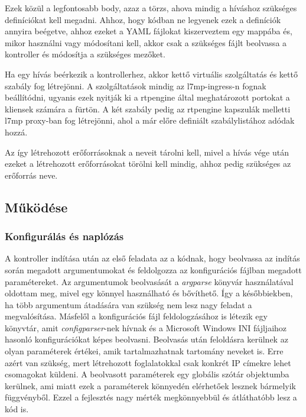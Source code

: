 Ezek közül a legfontosabb body, azaz a törzs, ahova mindig a híváshoz szükséges definíciókat
kell megadni. Ahhoz, hogy kódban ne legyenek ezek a definíciók annyira beégetve, ahhoz
ezeket a YAML fájlokat kiszerveztem egy mappába és, mikor használni vagy módosítani kell,
akkor csak a szükséges fájlt beolvassa a kontroller és módosítja a szükséges mezőket.

Ha egy hívás beérkezik a kontrollerhez, akkor kettő virtuális szolgáltatás és kettő
szabály fog létrejönni. A szolgáltatások mindig az l7mp-ingress-n fognak beállítódni, 
ugyanis ezek nyitják ki a rtpengine által meghatározott portokat a kliensek számára
a fürtön. A két szabály pedig az rtpengine kapszulák melletti l7mp proxy-ban 
fog létrejönni, ahol a már előre definiált szabálylistához adódak hozzá. 

Az így létrehozott erőforrásoknak a neveit tárolni kell, mivel a hívás vége után ezeket
a létrehozott erőforrásokat törölni kell mindig, ahhoz pedig szükséges az erőforrás 
neve. 

\subsection{Működése}

\subsubsection{Konfigurálás és naplózás}

A kontroller indítása után az első feladata az a kódnak, hogy beolvassa az indítás
során megadott argumentumokat és feldolgozza az konfigurációs fájlban megadott 
paramétereket. Az argumentumok beolvasását a \textit{argparse} könyvár használatával
oldottam meg, mivel egy könnyel használható és bővíthető. Így a későbbiekben, ha 
több argumentum átadására van szükség nem lesz nagy feladat a megvalósítása. Másfelől
a konfigurációs fájl feldologzásához is létezik egy könyvtár, amit \textit{configparser}-nek
hívnak és a Microsoft Windows INI fájljaihoz hasonló konfigurációkat képes beolvasni. Beolvasás
után feloldásra kerülnek az olyan paraméterek értékei, amik tartalmazhatnak tartomány neveket
is. Erre azért van szükség, mert létrehozott foglalatokkal csak konkrét IP címekre lehet 
csomagokat küldeni. A beolvasott paraméterek egy globális szótár objektumba kerülnek, ami 
miatt ezek a paraméterek könnyedén elérhetőek lesznek bármelyik függvényből. Ezzel a fejlesztés
nagy mérték megkönnyebbül és átláthatóbb lesz a kód is. \\

